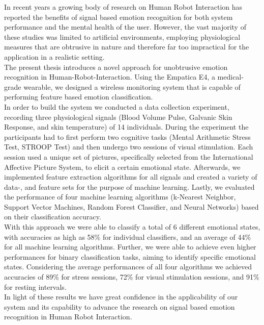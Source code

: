

In recent years a growing body of research on Human Robot Interaction has reported the benefits of signal based emotion recognition for both system performance and the mental health of the user. However, the vast majority of these studies was limited to artificial environments, employing physiological measures that are obtrusive in nature and therefore far too impractical for the application in a realistic setting.\\
The present thesis introduces a novel approach for unobtrusive emotion recognition in Human-Robot-Interaction. Using the Empatica E4, a medical-grade wearable, we designed a wireless monitoring system that is capable of performing feature based emotion classification.\\
In order to build the system we conducted a data collection experiment, recording three physiological signals (Blood Volume Pulse, Galvanic Skin Response, and skin temperature) of 14 individuals. During the experiment the participants had to first perform two cognitive tasks (Mental Arithmetic Stress Test, STROOP Test) and then undergo two sessions of visual stimulation. Each session used a unique set of pictures, specifically selected from the International Affective Picture System, to elicit a certain emotional state.
Afterwards, we implemented feature extraction algorithms for all signals and created a variety of data-, and feature sets for the purpose of machine learning.
Lastly, we evaluated the performance of four machine learning algorithms (k-Nearest Neighbor, Support Vector Machines, Random Forest Classifier, and Neural Networks) based on their classification accuracy.\\
With this approach we were able to classify a total of 6 different emotional states, with accuracies as high as 58\% for individual classifiers, and an average of 44\% for all machine learning algorithms. 
Further, we were able to achieve even higher performances for binary classification tasks, aiming to identify specific emotional states. Considering the average performances of all four algorithms we achieved accuracies of 89\% for stress sessions, 72\% for visual stimulation sessions, and 91\% for resting intervals.\\ 
In light of these results we have great confidence in the applicability of our system and its capability to advance the research on signal based emotion recognition in Human Robot Interaction.  
